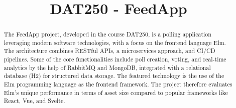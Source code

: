 \documentclass[11pt]{article}
\begin{document}
\title{DAT250 - FeedApp}


\maketitle

\begin{abstract}

  The FeedApp project, developed in the course DAT250, is a polling application leveraging modern software technologies, with a focus on the frontend language Elm. The architecture combines RESTful APIs, a microservices approach, and CI/CD pipelines. Some of the core functionalities include poll creation, voting, and real-time analytics by the help of RabbitMQ and MongoDB, integrated with a relational database (H2) for structured data storage. The featured technology is the use of the Elm programming language as the frontend framework. The project therefore evaluates Elm's unique performance in terms of asset size compared to popular frameworks like React, Vue, and Svelte.

\end{abstract}

%















{}
\end{document}
